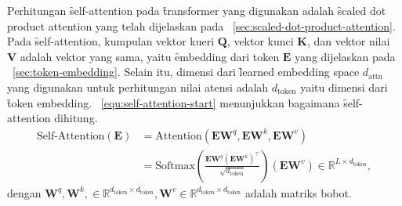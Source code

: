 	Perhitungan \f{self-attention} pada \f{transformer} yang digunakan adalah \f{scaled dot product attention} yang telah dijelaskan pada \sect~\ref{sec:scaled-dot-product-attention}. Pada \f{self-attention}, kumpulan vektor kueri $\mathbf{Q}$, vektor kunci $\mathbf{K}$, dan vektor nilai $\mathbf{V}$ adalah vektor yang sama, yaitu \f{embedding} dari token $\mathbf{E}$ yang dijelaskan pada \sect~\ref{sec:token-embedding}. Selain itu, dimensi dari \f{learned embedding space} $d_{\text{attn}}$ yang digunakan untuk perhitungan nilai atensi adalah $d_{\text{token}}$ yaitu dimensi dari \f{token embedding}. \equ~\ref{equ:self-attention-start} menunjukkan bagaimana \f{self-attention} dihitung.
	\begin{align}
		\label{equ:self-attention-start}
		\nonumber
		\text{Self-Attention}(\mathbf{E}) &= \text{Attention}(\mathbf{EW}^q, \mathbf{EW}^k, \mathbf{EW}^v) \\
		&= \text{Softmax}(\frac{\mathbf{E} \mathbf{W}^q (\mathbf{E} \mathbf{W}^k)^{\top}}{\sqrt{d_{\text{token}}}}) (\mathbf{E} \mathbf{W}^v) \in \mathbb{R}^{L \times d_{\text{token}}},
	\end{align}
	dengan $\mathbf{W}^q, \mathbf{W}^k, \in \mathbb{R}^{d_{\text{token}} \times d_{\text{token}}}, \mathbf{W}^v \in \mathbb{R}^{d_{\text{token}} \times d_{\text{token}}}$ adalah matriks bobot.

